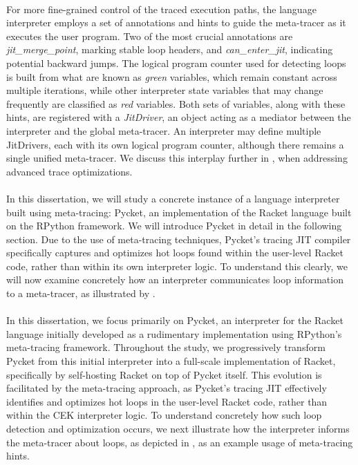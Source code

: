         \paragraph{}%
            For more fine-grained control of the traced execution paths, the language interpreter employs a set of annotations and hints to guide the meta-tracer as it executes the user program. Two of the most crucial annotations are \emph{jit\_merge\_point}, marking stable loop headers, and \emph{can\_enter\_jit}, indicating potential backward jumps. The logical program counter used for detecting loops is built from what are known as \emph{green} variables, which remain constant across multiple iterations, while other interpreter state variables that may change frequently are classified as \emph{red} variables. Both sets of variables, along with these hints, are registered with a \emph{JitDriver}, an object acting as a mediator between the interpreter and the global meta-tracer. An interpreter may define multiple JitDrivers, each with its own logical program counter, although there remains a single unified meta-tracer. We discuss this interplay further in , when addressing advanced trace optimizations.

        \paragraph{}%
            In this dissertation, we will study a concrete instance of a language interpreter built using meta-tracing: Pycket, an implementation of the Racket language built on the RPython framework. We will introduce Pycket in detail in the following section. Due to the use of meta-tracing techniques, Pycket’s tracing JIT compiler specifically captures and optimizes hot loops found within the user-level Racket code, rather than within its own interpreter logic. To understand this clearly, we will now examine concretely how an interpreter communicates loop information to a meta-tracer, as illustrated by .

        \paragraph{}%
            In this dissertation, we focus primarily on Pycket, an interpreter for the Racket language initially developed as a rudimentary implementation using RPython’s meta-tracing framework. Throughout the study, we progressively transform Pycket from this initial interpreter into a full-scale implementation of Racket, specifically by self-hosting Racket on top of Pycket itself. This evolution is facilitated by the meta-tracing approach, as Pycket's tracing JIT effectively identifies and optimizes hot loops in the user-level Racket code, rather than within the CEK interpreter logic. To understand concretely how such loop detection and optimization occurs, we next illustrate how the interpreter informs the meta-tracer about loops, as depicted in , as an example usage of meta-tracing hints.


